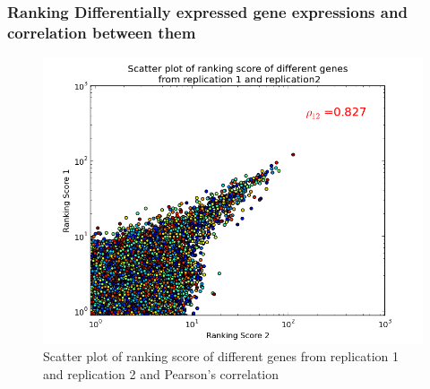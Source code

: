 \documentclass{beamer}
\begin{document}
\begin{frame}
\frametitle{Ranking Differentially expressed gene expressions and correlation between them}
\begin{figure}[t]
	\centering
		\includegraphics[scale=.3,keepaspectratio]{diagrams/RankingScore12.png}
		\caption[Pearson's correlation between different ranking scores]
		{Scatter plot of ranking score of different genes from replication 1 and replication 2 and Pearson's correlation}
	\label{fig:ranking_scores}
\end{figure}

\end{frame}
\end{document}
